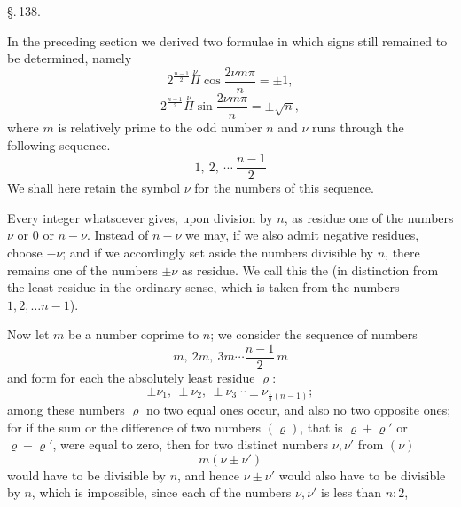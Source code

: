 \begin{center}
\S.\,138.

\end{center}

In the preceding section we derived two formulae in which signs still remained to be determined, namely
\[
2^{\frac{n-1}{2}} \overset{\nu}{\Pi} \cos\frac{2\nu m\pi}{n} = \pm 1, \tag{1}
\]
\[
2^{\frac{n-1}{2}} \overset{\nu}{\Pi} \sin\frac{2\nu m\pi}{n} = \pm \sqrt{n}, \tag{2}
\]
where $m$ is relatively prime to the odd number $n$ and $\nu$ runs through the following sequence.
\[
1,\ 2,\ \cdots\ \frac{n-1}{2} \tag{$\nu$}
\]
We shall here retain the symbol $\nu$ for the numbers of this sequence.

Every integer whatsoever gives, upon division by $n$, as residue one of the numbers $\nu$ or $0$ or $n-\nu$. Instead of $n-\nu$ we may, if we also admit negative residues, choose $-\nu$; and if we accordingly set aside the numbers divisible by $n$, there remains one of the numbers $\pm\nu$ as residue. We call this the  (in distinction from the least residue in the ordinary sense, which is taken from the numbers $1, 2, \ldots n-1$).

Now let $m$ be a number coprime to $n$; we consider the sequence of numbers
\[
m,\ 2m,\ 3m \cdots \frac{n-1}{2}\, m \tag{$m\nu$}
\]
and form for each the absolutely least residue $\varrho$:
\[
\pm \nu_1,\ \pm \nu_2,\ \pm \nu_3 \cdots \pm \nu_{\frac{1}{2}(n-1)}; \tag{$\varrho$}
\]
among these numbers $\varrho$ no two equal ones occur, and also no two opposite ones; for if the sum or the difference of two numbers $(\varrho)$, that is $\varrho+\varrho'$ or $\varrho-\varrho'$, were equal to zero, then for two distinct numbers $\nu, \nu'$ from $(\nu)$
\[
m(\nu \pm \nu')
\]
would have to be divisible by $n$, and hence $\nu \pm \nu'$ would also have to be divisible by $n$, which is impossible, since each of the numbers $\nu, \nu'$ is less than $n:2$,

